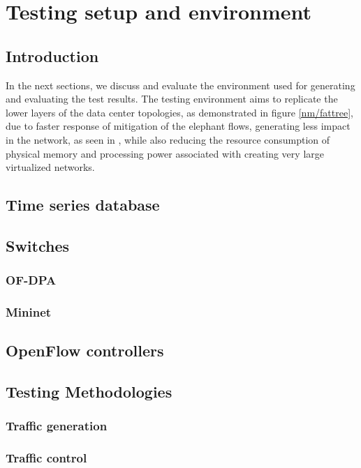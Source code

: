 \chapter{Testing setup and environment} \label{chap:me} %

\section {Introduction}

In the next sections, we discuss and evaluate the environment used for generating and evaluating the test results. The testing environment aims to replicate the lower layers of the data center topologies, as demonstrated in 
figure \ref{nm/fattree}, due to faster response of mitigation of the elephant flows, generating less impact in the network, as seen in \cite { CITE - http://ieeexplore.ieee.org/document/7366826/}, while also reducing the 
resource consumption of physical memory and processing power associated with creating very large virtualized networks. 

\section {Time series database}
\section {Switches}
\subsection {OF-DPA}
\subsection {Mininet}
\section {OpenFlow controllers}
\section {Testing Methodologies}
\subsection {Traffic generation}
\subsection {Traffic control}
